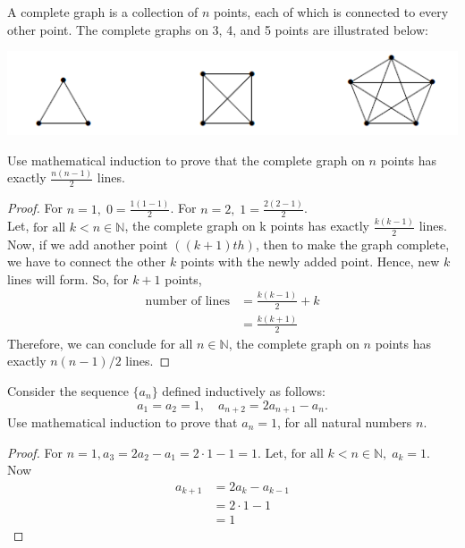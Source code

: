 \documentclass[12pt]{article}
\newenvironment{problem}[2][Problem]{\begin{trivlist}
\item[\hskip \labelsep {\bfseries #1}\hskip \labelsep {\bfseries #2.}]}{\end{trivlist}}
\begin{document}
\begin{problem}{10}
A complete graph is a collection of \( n \) points, each of which is connected to every
other point. The complete graphs on 3, 4, and 5 points are illustrated below:\\
\begin{center}
    \includegraphics[width=0.5\linewidth]{image.png}
\end{center}
Use mathematical induction to prove that the complete graph on \( n \) points has exactly $\frac{n(n-1)}{2}$ lines.

\end{problem}

\begin{proof}
For $n = 1, \; 0 = \frac{1(1-1)}{2}$. For $n = 2, \; 1 = \frac{2(2-1)}{2}$. \\
Let, $\text{for all } k < n \in \mathbb{N}$, the complete graph on k points has exactly $\frac{k(k-1)}{2}$ lines. \\
Now, if we add another point $((k+1)th)$, then to make the graph complete, we have to connect the other $k$ points with the newly added point. Hence, new $k$ lines will form.
So, for $k + 1$ points, 
\begin{align*}
\text{number of lines} & = \frac{k(k-1)}{2} + k \\
& = \frac{k(k+1)}{2}
\end{align*}
Therefore, we can conclude $\text{for all } n \in \mathbb{N}$, the complete graph on $n$ points has exactly $n(n-1)/2$ lines.

\end{proof}

\begin{problem}{11}
Consider the sequence \( \{a_n\} \) defined inductively as follows:
\[
a_1 = a_2 = 1, \quad a_{n+2} = 2a_{n+1} - a_n.
\]
Use mathematical induction to prove that \( a_n = 1 \), for all natural numbers \( n \).

\end{problem}

\begin{proof}
For $n = 1, a_3 = 2a_2 - a_1 = 2\cdot 1 - 1 = 1$. Let, $\text{for all } k < n \in \mathbb{N}, \; a_k = 1$.\\
Now
\begin{align*}
a_{k+1} & = 2a_k - a_{k-1} \\
& = 2\cdot 1 - 1 \\
& = 1
\end{align*}

\end{proof}
\end{document}
